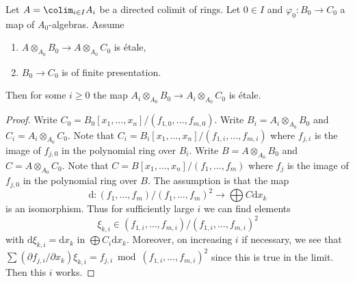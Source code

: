 \begin{lemma}
\label{lemma-colimit-etale}
Let $A = \colim_{i \in I} A_i$ be a directed colimit of rings.
Let $0 \in I$ and $\varphi_0 : B_0 \to C_0$ a map of $A_0$-algebras.
Assume
\begin{enumerate}
\item $A \otimes_{A_0} B_0 \to A \otimes_{A_0} C_0$ is \'etale,
\item $B_0 \to C_0$ is of finite presentation.
\end{enumerate}
Then for some $i \geq 0$ the map
$A_i \otimes_{A_0} B_0 \to A_i \otimes_{A_0} C_0$
is \'etale.
\end{lemma}

\begin{proof}
Write $C_0 = B_0[x_1, \ldots, x_n]/(f_{1, 0}, \ldots, f_{m, 0})$.
Write $B_i = A_i \otimes_{A_0} B_0$ and $C_i = A_i \otimes_{A_0} C_0$.
Note that $C_i = B_i[x_1, \ldots, x_n]/(f_{1, i}, \ldots, f_{m, i})$
where $f_{j, i}$ is the image of $f_{j, 0}$ in the polynomial ring
over $B_i$. Write $B = A \otimes_{A_0} B_0$ and $C = A \otimes_{A_0} C_0$.
Note that $C = B[x_1, \ldots, x_n]/(f_1, \ldots, f_m)$
where $f_j$ is the image of $f_{j, 0}$ in the polynomial ring
over $B$. The assumption is that the map
$$
\text{d} :
(f_1, \ldots, f_m)/(f_1, \ldots, f_m)^2
\longrightarrow
\bigoplus C \text{d}x_k
$$
is an isomorphism. Thus for sufficiently large $i$ we can find elements
$$
\xi_{k, i} \in (f_{1, i}, \ldots, f_{m, i})/(f_{1, i}, \ldots, f_{m, i})^2
$$
with $\text{d}\xi_{k, i} = \text{d}x_k$ in $\bigoplus C_i \text{d}x_k$.
Moreover, on increasing $i$ if necessary, we see that
$\sum (\partial f_{j, i}/\partial x_k) \xi_{k, i} =
f_{j, i} \bmod (f_{1, i}, \ldots, f_{m, i})^2$
since this is true in the limit. Then this $i$ works.
\end{proof}
